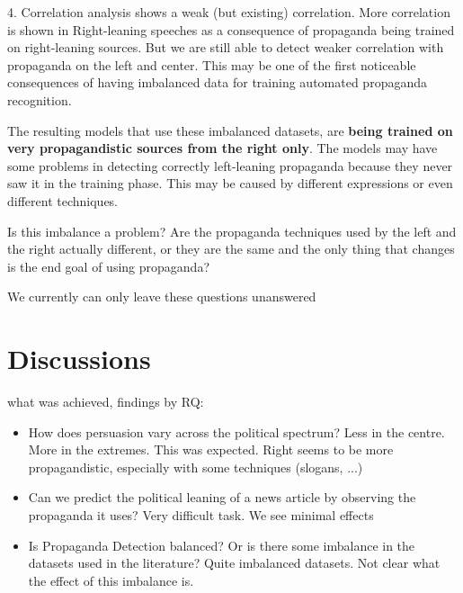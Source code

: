 4. Correlation analysis shows a weak (but existing) correlation.
More correlation is shown in Right-leaning speeches as a consequence of propaganda being trained on right-leaning sources. But we are still able to detect weaker correlation with propaganda on the left and center.
This may be one of the first noticeable consequences of having imbalanced data for training automated propaganda recognition.




The resulting models that use these imbalanced datasets, are \textbf{being trained on very propagandistic sources from the right only}. The models may have some problems in detecting correctly left-leaning propaganda because they never saw it in the training phase. This may be caused by different expressions or even different techniques.

Is this imbalance a problem? Are the propaganda techniques used by the left and the right actually different, or they are the same and the only thing that changes is the end goal of using propaganda?


We currently can only leave these questions unanswered


\section{Discussions}
\label{sec:ps_discussions}

what was achieved, findings by RQ:

\begin{itemize}
    \item How does persuasion vary across the political spectrum? Less in the centre. More in the extremes. This was expected. Right seems to be more propagandistic, especially with some techniques (slogans, ...)
    \item Can we predict the political leaning of a news article by observing the propaganda it uses? Very difficult task. We see minimal effects
    \item Is Propaganda Detection balanced? Or is there some imbalance in the datasets used in the literature? Quite imbalanced datasets. Not clear what the effect of this imbalance is.
\end{itemize}

